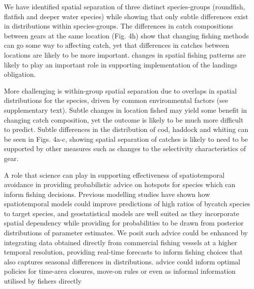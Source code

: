 \documentclass[12pt]{article}
\begin{document}
\begin{linenumbers}
 We have
identified spatial separation of three distinct species-groups (roundfish,
flatfish and deeper water species) while showing that only subtle differences
exist in distributions within species-groups. The differences in catch
compositions between gears at the same location (Fig. 4h) show that changing
fishing methods can go some way to affecting catch, yet that differences in
catches between locations are likely to be more important.  changes in spatial fishing patterns
are likely to play an important role in supporting implementation of the
landings obligation.

More challenging is within-group spatial separation due to
overlaps in spatial distributions for the species, driven
by common environmental factors (see supplementary text). Subtle changes in
location fished may yield some benefit in changing catch composition, yet the
outcome is likely to be much more difficult to predict.
Subtle differences in the distribution of cod, haddock and whiting can be seen
in Figs. 4a-c, showing spatial separation of catches is likely to need to be supported by other
measures such as changes to the selectivity characteristics of
gear\cite{Santos2016}. 

A role that science can play in supporting effectiveness of spatiotemporal
avoidance in providing probabilistic advice
on hotspots for species which can inform fishing decisions. Previous modelling studies
have shown how spatiotemporal models could improve predictions of high ratios
of bycatch species to target species\cite{Ward2015, Cosandey-Godin2015,
	Breivik2016}, and geostatistical models are well suited as they incorporate spatial dependency while providing for
probabilities to be drawn from posterior distributions of parameter
estimates. We posit such advice could be enhanced by integrating
data obtained directly from commercial fishing vessels at a higher temporal
resolution, providing real-time forecasts to inform fishing choices that also
captures seasonal differences in distributions.  advice could inform optimal policies for
time-area closures, move-on rules or even as informal information utilised by fishers directly


\end{linenumbers}
\end{document}
